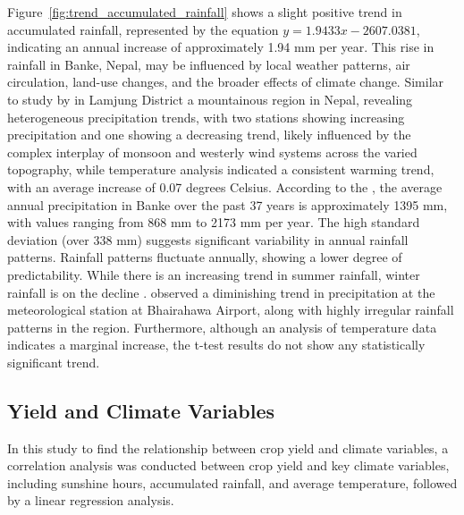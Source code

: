 Figure~\ref{fig:trend_accumulated_rainfall} shows a slight positive trend in accumulated rainfall, represented by the equation $y=1.9433x - 2607.0381$, indicating an annual increase of approximately 1.94 mm per year. This rise in rainfall in Banke, Nepal, may be influenced by local weather patterns, air circulation, land-use changes, and the broader effects of climate change. Similar to study by \citet{poudelRelationshipsClimateVariability2016} in Lamjung District a mountainous region in Nepal, revealing heterogeneous precipitation trends, with two stations showing increasing precipitation and one showing a decreasing trend, likely influenced by the complex interplay of monsoon and westerly wind systems across the varied topography, while temperature analysis indicated a consistent warming trend, with an average increase of 0.07 degrees Celsius.
According to the \citet{regmiCROPYIELDRESPONSE2019}, the average annual precipitation in Banke over the past 37 years is approximately 1395 mm, with values ranging from 868 mm to 2173 mm per year. The high standard deviation (over 338 mm) suggests significant variability in annual rainfall patterns. 
Rainfall patterns fluctuate annually, showing a lower degree of predictability. While there is an increasing trend in summer rainfall, winter rainfall is on the decline \citep{maharjanEffectClimateVariables2013}.
\citet{manandharAdaptingCroppingSystems2011} observed a diminishing trend in precipitation at the meteorological station at Bhairahawa Airport, along with highly irregular rainfall patterns in the region. Furthermore, although an analysis of temperature data indicates a marginal increase, the t-test results do not show any statistically significant trend.

\subsection{Yield and Climate Variables}
In this study to find the relationship between crop yield and climate variables, a correlation analysis was conducted between crop yield and key climate variables, including sunshine hours, accumulated rainfall, and average temperature, followed by a linear regression analysis.

\begin{table}[htbp]
    \centering
    \caption{Correlation Table between Yield and Climate Variables}
\end{table}

